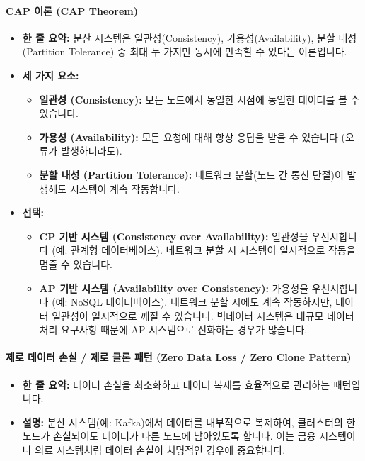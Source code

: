 \documentclass[11pt,a4paper]{article}
\begin{document}
\paragraph{CAP 이론 (CAP Theorem)}
\begin{itemize}
    \item \textbf{한 줄 요약:} 분산 시스템은 일관성(Consistency), 가용성(Availability), 분할 내성(Partition Tolerance) 중 최대 두 가지만 동시에 만족할 수 있다는 이론입니다.
    \item \textbf{세 가지 요소:}
    \begin{itemize}
        \item \textbf{일관성 (Consistency):} 모든 노드에서 동일한 시점에 동일한 데이터를 볼 수 있습니다.
        \item \textbf{가용성 (Availability):} 모든 요청에 대해 항상 응답을 받을 수 있습니다 (오류가 발생하더라도).
        \item \textbf{분할 내성 (Partition Tolerance):} 네트워크 분할(노드 간 통신 단절)이 발생해도 시스템이 계속 작동합니다.
    \end{itemize}
    \item \textbf{선택:}
    \begin{itemize}
        \item \textbf{CP 기반 시스템 (Consistency over Availability):} 일관성을 우선시합니다 (예: 관계형 데이터베이스). 네트워크 분할 시 시스템이 일시적으로 작동을 멈출 수 있습니다.
        \item \textbf{AP 기반 시스템 (Availability over Consistency):} 가용성을 우선시합니다 (예: NoSQL 데이터베이스). 네트워크 분할 시에도 계속 작동하지만, 데이터 일관성이 일시적으로 깨질 수 있습니다. 빅데이터 시스템은 대규모 데이터 처리 요구사항 때문에 AP 시스템으로 진화하는 경우가 많습니다.
    \end{itemize}
\end{itemize}

\paragraph{제로 데이터 손실 / 제로 클론 패턴 (Zero Data Loss / Zero Clone Pattern)}
\begin{itemize}
    \item \textbf{한 줄 요약:} 데이터 손실을 최소화하고 데이터 복제를 효율적으로 관리하는 패턴입니다.
    \item \textbf{설명:} 분산 시스템(예: Kafka)에서 데이터를 내부적으로 복제하여, 클러스터의 한 노드가 손실되어도 데이터가 다른 노드에 남아있도록 합니다. 이는 금융 시스템이나 의료 시스템처럼 데이터 손실이 치명적인 경우에 중요합니다.
\end{itemize}
\end{document}
